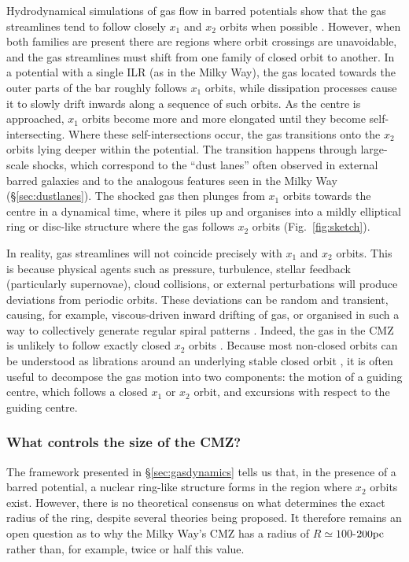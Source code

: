 Hydrodynamical simulations of gas flow in barred potentials show that the gas streamlines tend to follow closely $x_1$ and $x_2$ orbits when possible \citep{Athanassoula1992b,Sormani2015c}. However, when both families are present there are regions where orbit crossings are unavoidable, and the gas streamlines must shift from one family of closed orbit to another. In a potential with a single ILR (as in the Milky Way), the gas located towards the outer parts of the bar roughly follows $x_1$ orbits, while dissipation processes cause it to slowly drift inwards along a sequence of such orbits. As the centre is approached, $x_1$ orbits become more and more elongated until they become self-intersecting. Where these self-intersections occur, the gas transitions onto the $x_2$ orbits lying deeper within the potential.
The transition happens through large-scale shocks, which correspond to the ``dust lanes'' often observed in external barred galaxies \citep{Athanassoula1992b} and to the analogous features seen in the Milky Way (\S\ref{sec:dustlanes}). The shocked gas then plunges from $x_1$ orbits towards the centre in a dynamical time, where it piles up and organises into a mildly elliptical ring or disc-like structure where the gas follows $x_2$ orbits (Fig.~\ref{fig:sketch}). 

In reality, gas streamlines will not coincide precisely with $x_1$ and $x_2$ orbits. This is because physical agents such as pressure, turbulence, stellar feedback (particularly supernovae), cloud collisions, or external perturbations will produce deviations from periodic orbits. These deviations can be random and transient, causing, for example, viscous-driven inward drifting of gas, or organised in such a way to collectively generate regular spiral patterns \citep{Sormani2015b}. Indeed, the gas in the CMZ is unlikely to follow exactly closed $x_2$ orbits \citep{Kruijssen2015,Tress2020}. Because most non-closed orbits can be understood as librations around an underlying stable closed orbit \citep{Binney2008}, it is often useful to decompose the gas motion into two components: the motion of a guiding centre, which follows a closed $x_1$ or $x_2$ orbit, and excursions with respect to the guiding centre.

\subsubsection{What controls the size of the CMZ?} \label{sec:insights}

The framework presented in \S\ref{sec:gasdynamics} tells us that, in the presence of a barred potential, a nuclear ring-like structure forms in the region where $x_2$ orbits exist. 
However, there is no theoretical consensus on what determines the exact radius of the ring, despite several theories being proposed. 
It therefore remains an open question as to why the Milky Way's CMZ has a radius of $R\simeq100$-$200\mbox{${\rm pc}$}$ rather than, for example, twice or half this value.

